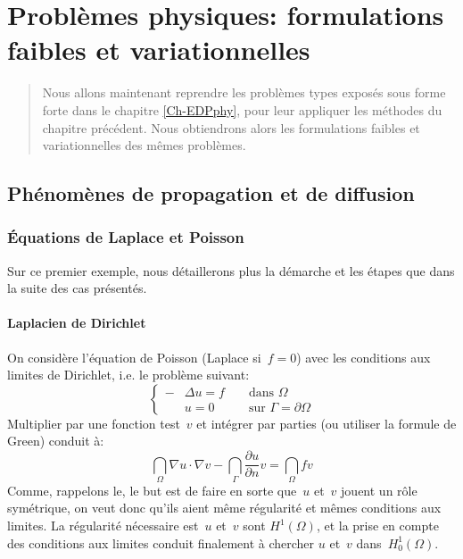 \chapter{Problèmes physiques: formulations faibles et variationnelles}
\begin{abstract}
Nous allons maintenant reprendre les problèmes types exposés sous forme forte dans le chapitre \ref{Ch-EDPphy}, pour leur appliquer les méthodes du chapitre précédent.
Nous obtiendrons alors les formulations faibles et variationnelles des mêmes problèmes.
\end{abstract}

\medskip
\section{Phénomènes de propagation et de diffusion}
\medskip
\subsection{Équations de Laplace et Poisson}

Sur ce premier exemple, nous détaillerons plus la démarche et les étapes que dans la suite des cas présentés.

\medskip
\subsubsection{Laplacien de Dirichlet}
On considère l'équation de Poisson (Laplace si~$f=0$) avec les conditions aux limites de Dirichlet, i.e. le problème suivant:
\begin{equation}\left\{\begin{aligned}
-&\Delta u=f &&\text{ dans } \Omega\\
&u=0 &&\text{ sur } \Gamma=\partial\Omega
\end{aligned}
\right.
\end{equation}
Multiplier par une fonction test~$v$ et intégrer par parties (ou utiliser la formule de Green) conduit à:
\begin{equation}
\dint_\Omega \nabla u\cdot\nabla v -\dint_\Gamma \dfrac{\partial u}{\partial n}v =
\dint_\Omega fv
\end{equation}
Comme, rappelons le, le but est de faire en sorte que~$u$ et~$v$ jouent un rôle symétrique, on veut donc qu'ils aient même régularité et mêmes conditions aux limites. La régularité nécessaire est~$u$ et~$v$ sont $H^1(\Omega)$, et la prise en compte des conditions aux limites conduit finalement à chercher $u$ et~$v$ dans~$H^1_0(\Omega)$.

